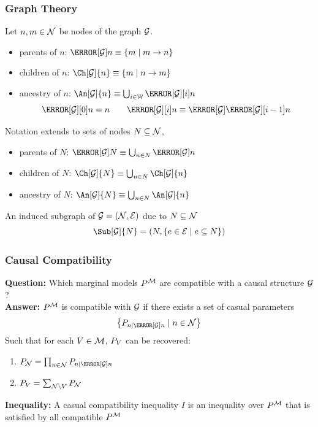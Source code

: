 \documentclass[
    hyperref={bookmarks=false},%
    xcolor={dvipsnames},
]{beamer}
\renewcommand{\term}[1]{\textcolor{Mahogany}{#1}}
\begin{document}
\begin{frame}
    \frametitle{Graph Theory}
    Let $n, m \in \mathcal{N}$ be nodes of the graph $\mathcal{G}$.
    \begin{itemize}
        \item \term{parents of $n$}: $\Pa[\graph]{n} \defined \bc{m \mid m \to n}$
        \item \term{children of $n$}: $\Ch[\graph]{n} \defined \bc{m \mid n \to m}$
        \item \term{ancestry of $n$}: $\An[\graph]{n} \defined \bigcup_{i\in\mathbb{W}} \Pa[\graph][i]{n}$
        \[ \Pa[\graph][0]{n} = n \qquad \Pa[\graph][i]{n} \defined \Pa[\graph]{\Pa[\graph][i-1]{n}} \]
    \end{itemize}
    Notation extends to sets of nodes $N \subseteq \mathcal{N}$,
    \begin{itemize}
        \item \term{parents of $N$}: $\Pa[\graph]{N} \defined \bigcup_{n\in N}\Pa[\graph]{n}$
        \item \term{children of $N$}: $\Ch[\graph]{N} \defined \bigcup_{n\in N}\Ch[\graph]{n}$
        \item \term{ancestry of $N$}: $\An[\graph]{N} \defined \bigcup_{n\in N}\An[\graph]{n}$
    \end{itemize}
    An \term{induced subgraph} of $\graph = \br{\nodes, \edges}$ due to $N \subseteq \mathcal{N}$
    \[ \Sub[\graph]{N} = \br{N, \bc{e \in \edges \mid e \subseteq N}} \]
\end{frame}

\begin{frame}
    \frametitle{Causal Compatibility}
    \textbf{Question:} Which marginal models $\prob^{\mscenario}$ are \term{compatible} with a causal structure $\mathcal{G}$?\\
    \textbf{Answer:} $\prob^{\mscenario}$ is compatible with $\mathcal{G}$ if there exists a set of \term{casual parameters}
    \[ \bc{\prob[n \mid \Pa[\graph]{n}] \mid n \in \nodes} \]
    Such that for each $V \in \mathcal{M}$, $\prob[V]$ can be recovered:
    \begin{enumerate}
        \item $\prob[\nodes] = \prod_{n\in\nodes}\prob[n \mid \Pa[\graph]{n}]$
        \item $\prob[V] = \sum_{\nodes \setminus V} \prob[\nodes]$
    \end{enumerate}
    \textbf{Inequality:} A \term{casual compatibility inequality} $I$ is an inequality over $\prob^{\mscenario}$ that is satisfied by all compatible $\prob^{\mscenario}$
\end{frame}
\end{document}
